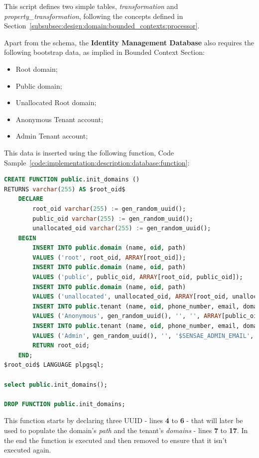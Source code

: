 This script defines two simple tables, \textit{transformation} and \textit{property\_transformation}, following the concepts defined in Section~\ref{subsubsec:design:domain:bounded_contexts:processor}.

Apart from the schema, the \textbf{Identity Management Database} also requires the following bootstrap data, as implied in  Bounded Context Section:

\begin{itemize}
    \item Root domain;
    \item Public domain;
    \item Unallocated Root domain;
    \item Anonymous Tenant account;
    \item Admin Tenant account;
\end{itemize}

This data is inserted using the following function, Code Sample~\ref{code:implementation:description:database:function}:

\begin{lstlisting}[language=SQL, caption=Bootstrap function for Identity Management Database, label={code:implementation:description:database:function}]
CREATE FUNCTION public.init_domains ()
RETURNS varchar(255) AS $root_oid$
    DECLARE
        root_oid varchar(255) := gen_random_uuid();
        public_oid varchar(255) := gen_random_uuid();
        unallocated_oid varchar(255) := gen_random_uuid();
    BEGIN
        INSERT INTO public.domain (name, oid, path)
        VALUES ('root', root_oid, ARRAY[root_oid]);
        INSERT INTO public.domain (name, oid, path)
        VALUES ('public', public_oid, ARRAY[root_oid, public_oid]);
        INSERT INTO public.domain (name, oid, path)
        VALUES ('unallocated', unallocated_oid, ARRAY[root_oid, unallocated_oid]);
        INSERT INTO public.tenant (name, oid, phone_number, email, domains)
        VALUES ('Anonymous', gen_random_uuid(), '', '', ARRAY[public_oid]);
        INSERT INTO public.tenant (name, oid, phone_number, email, domains)
        VALUES ('Admin', gen_random_uuid(), '', '$SENSAE_ADMIN_EMAIL', ARRAY[root_oid]);
        RETURN root_oid;
    END;
$root_oid$ LANGUAGE plpgsql;

select public.init_domains();

DROP FUNCTION public.init_domains;
\end{lstlisting}

This function starts by declaring three \gls{UUID} - lines \textbf{4} to \textbf{6} - that will later be used to populate the domain's \textit{path} and the tenant's \textit{domains} - lines \textbf{7} to \textbf{17}. In the end the function is executed and then removed to ensure that it isn't executed again.

